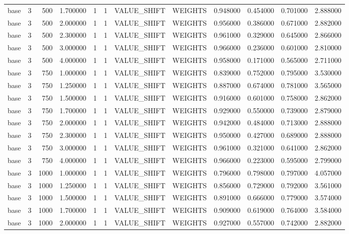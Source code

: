 \begin{tabular}{lrrrllllrrrr}
base & 3 & 500 & 1.700000 & 1 & 1 & VALUE_SHIFT & WEIGHTS & 0.948000 & 0.454000 & 0.701000 & 2.888000 \\
base & 3 & 500 & 2.000000 & 1 & 1 & VALUE_SHIFT & WEIGHTS & 0.956000 & 0.386000 & 0.671000 & 2.882000 \\
base & 3 & 500 & 2.300000 & 1 & 1 & VALUE_SHIFT & WEIGHTS & 0.961000 & 0.329000 & 0.645000 & 2.866000 \\
base & 3 & 500 & 3.000000 & 1 & 1 & VALUE_SHIFT & WEIGHTS & 0.966000 & 0.236000 & 0.601000 & 2.810000 \\
base & 3 & 500 & 4.000000 & 1 & 1 & VALUE_SHIFT & WEIGHTS & 0.958000 & 0.171000 & 0.565000 & 2.711000 \\
base & 3 & 750 & 1.000000 & 1 & 1 & VALUE_SHIFT & WEIGHTS & 0.839000 & 0.752000 & 0.795000 & 3.530000 \\
base & 3 & 750 & 1.250000 & 1 & 1 & VALUE_SHIFT & WEIGHTS & 0.887000 & 0.674000 & 0.781000 & 3.565000 \\
base & 3 & 750 & 1.500000 & 1 & 1 & VALUE_SHIFT & WEIGHTS & 0.916000 & 0.601000 & 0.758000 & 2.862000 \\
base & 3 & 750 & 1.700000 & 1 & 1 & VALUE_SHIFT & WEIGHTS & 0.929000 & 0.550000 & 0.739000 & 2.879000 \\
base & 3 & 750 & 2.000000 & 1 & 1 & VALUE_SHIFT & WEIGHTS & 0.942000 & 0.484000 & 0.713000 & 2.888000 \\
base & 3 & 750 & 2.300000 & 1 & 1 & VALUE_SHIFT & WEIGHTS & 0.950000 & 0.427000 & 0.689000 & 2.888000 \\
base & 3 & 750 & 3.000000 & 1 & 1 & VALUE_SHIFT & WEIGHTS & 0.961000 & 0.321000 & 0.641000 & 2.862000 \\
base & 3 & 750 & 4.000000 & 1 & 1 & VALUE_SHIFT & WEIGHTS & 0.966000 & 0.223000 & 0.595000 & 2.799000 \\
base & 3 & 1000 & 1.000000 & 1 & 1 & VALUE_SHIFT & WEIGHTS & 0.796000 & 0.798000 & 0.797000 & 4.057000 \\
base & 3 & 1000 & 1.250000 & 1 & 1 & VALUE_SHIFT & WEIGHTS & 0.856000 & 0.729000 & 0.792000 & 3.561000 \\
base & 3 & 1000 & 1.500000 & 1 & 1 & VALUE_SHIFT & WEIGHTS & 0.891000 & 0.666000 & 0.779000 & 3.574000 \\
base & 3 & 1000 & 1.700000 & 1 & 1 & VALUE_SHIFT & WEIGHTS & 0.909000 & 0.619000 & 0.764000 & 3.584000 \\
base & 3 & 1000 & 2.000000 & 1 & 1 & VALUE_SHIFT & WEIGHTS & 0.927000 & 0.557000 & 0.742000 & 2.882000 \\

\end{tabular}
